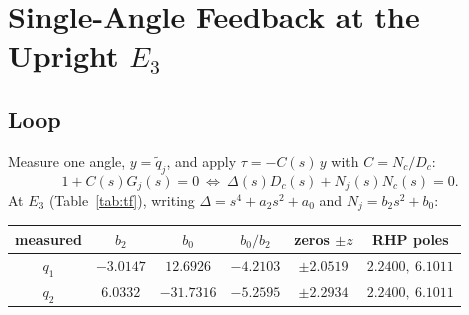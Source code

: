 \documentclass[10pt,letterpaper]{article}
\newenvironment{keep}{\par\noindent\begin{minipage}{\linewidth}}{\end{minipage}\par\smallskip}
\begin{document}
\begin{keep}
\section{Single-Angle Feedback at the Upright $E_3$}
\subsection{Loop}
Measure one angle, $y=\tilde q_j$, and apply $\tau=-C(s)\,y$ with $C=N_c/D_c$:
\begin{equation}
1+C(s)G_j(s)=0\ \Leftrightarrow\ \Delta(s)D_c(s)+N_j(s)N_c(s)=0 .\label{eq:loop}
\end{equation}
At $E_3$ (Table~\ref{tab:tf}), writing $\Delta=s^4+a_2s^2+a_0$ and $N_j=b_2s^2+b_0$:
\begin{center}
\label{tab:e3}
\footnotesize\setlength{\tabcolsep}{8pt}\renewcommand{\arraystretch}{0.95}
\begin{tabular}{@{}cccccc@{}}
\toprule
measured & $b_2$ & $b_0$ & $b_0/b_2$ & zeros $\pm z$ & RHP poles\\
\midrule
$q_1$ & $-3.0147$ & $12.6926$ & $-4.2103$ & $\pm2.0519$ & $2.2400,\ 6.1011$\\
$q_2$ & $6.0332$ & $-31.7316$ & $-5.2595$ & $\pm2.2934$ & $2.2400,\ 6.1011$\\
\bottomrule
\end{tabular}
\end{center}
\end{keep}
\end{document}
